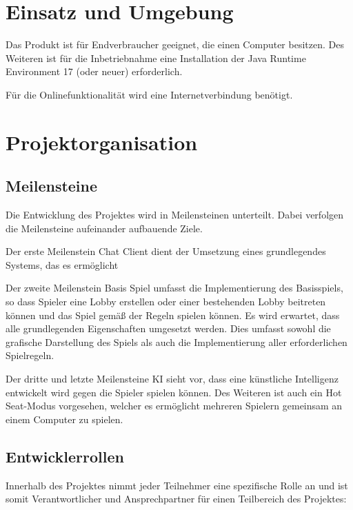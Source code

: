 \documentclass[a4paper]{scrreprt}
\begin{document}
\section{Einsatz und Umgebung}

Das Produkt ist für Endverbraucher geeignet, die einen Computer besitzen. Des Weiteren ist für die Inbetriebnahme eine Installation der \glqq Java Runtime Environment 17\grqq{} (oder neuer) erforderlich.

Für die Onlinefunktionalität wird eine Internetverbindung benötigt.

\section{Projektorganisation}
\subsection{Meilensteine}

Die Entwicklung des Projektes wird in Meilensteinen unterteilt. Dabei verfolgen die Meilensteine aufeinander aufbauende Ziele.

Der erste Meilenstein \glqq Chat Client\grqq{} dient der Umsetzung eines grundlegendes Systems, das es ermöglicht 

Der zweite Meilenstein \glqq Basis Spiel\grqq{} umfasst die Implementierung des Basisspiels, so dass Spieler eine Lobby erstellen oder einer bestehenden Lobby beitreten 
können und das Spiel gemäß der Regeln spielen können. Es wird erwartet, dass alle grundlegenden Eigenschaften umgesetzt werden. Dies umfasst sowohl die grafische Darstellung des Spiels als auch die Implementierung aller erforderlichen Spielregeln.

Der dritte und letzte Meilensteine \glqq KI\grqq{} sieht vor, dass eine künstliche Intelligenz entwickelt wird gegen die Spieler spielen können. Des Weiteren ist auch ein \glqq Hot Seat\grqq{}-Modus vorgesehen, welcher es ermöglicht mehreren Spielern gemeinsam an einem Computer zu spielen.

\subsection{Entwicklerrollen}

Innerhalb des Projektes nimmt jeder Teilnehmer eine spezifische Rolle an und ist somit Verantwortlicher und Ansprechpartner für einen Teilbereich des Projektes:
\end{document}
